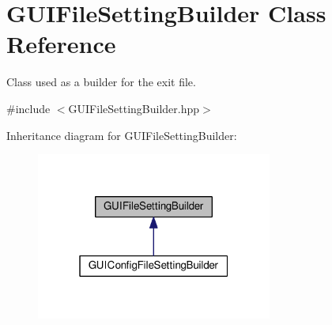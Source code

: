 \hypertarget{class_g_u_i_file_setting_builder}{}\section{G\+U\+I\+File\+Setting\+Builder Class Reference}
\label{class_g_u_i_file_setting_builder}


Class used as a builder for the exit file.  




{\ttfamily \#include $<$G\+U\+I\+File\+Setting\+Builder.\+hpp$>$}



Inheritance diagram for G\+U\+I\+File\+Setting\+Builder\+:
\nopagebreak
\begin{figure}[H]
\begin{center}
\leavevmode
\includegraphics[width=220pt]{class_g_u_i_file_setting_builder__inherit__graph}
\end{center}
\end{figure}
